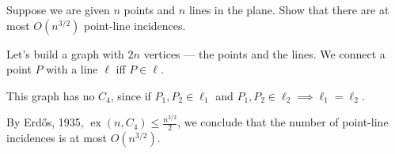 \documentclass[10pt, a4paper]{article}
\DeclareMathOperator\ex{ex}
\begin{document}
\newpage
\begin{prob}
	Suppose we are given $n$ points and $n$ lines in the plane. Show that there are at most $O(n^{3/2})$ point-line incidences.
\end{prob}
\begin{sol}
	Let's build a graph with $2n$ vertices --- the points and the lines. We connect a point $P$ with a line $\ell$ iff $P \in \ell$.

	This graph has no $C_4$, since if $P_1, P_2 \in \ell_1$ and $P_1, P_2 \in \ell_2 \implies \ell_1 = \ell_2$.

	By Erd\H{o}s, 1935, $\ex(n, C_4) \leqslant \frac{n^{3/2}}{2}$, we conclude that the number of point-line incidences is at most $O(n^{3/2})$.
\end{sol}
\end{document}
